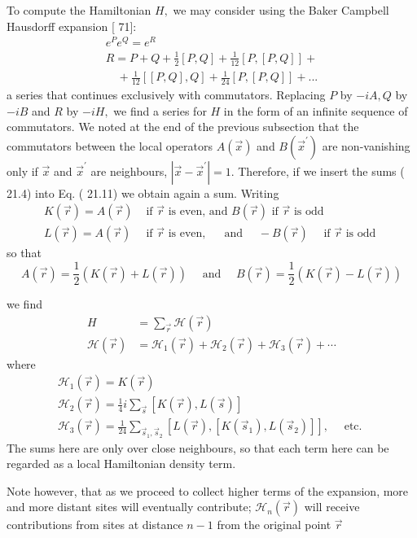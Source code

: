 \documentclass[main.tex]{subfiles}
\begin{document}
To compute the Hamiltonian $H,$ we may consider using the Baker Campbell Hausdorff expansion [ 71]:
$$
\begin{array}{l}
{e^{P} e^{Q}=e^{R}} \\
R = P+Q+\frac{1}{2}[P,Q] + \frac{1}{12}\left[P, [P,Q]\right]+\\
{\quad+\frac{1}{12}[[P, Q], Q]+\frac{1}{24}[P,[P, Q]]} +...
\end{array}
$$
a series that continues exclusively with commutators. Replacing $P$ by $-i A, Q$ by
$-i B$ and $R$ by $-i H,$ we find a series for $H$ in the form of an infinite sequence of commutators. We noted at the end of the previous subsection that the commutators between the local operators $A(\vec{x})$ and $B\left(\vec{x}^{\prime}\right)$ are non-vanishing only if $\vec{x}$ and $\vec{x}^{\prime}$ are neighbours, $\left|\vec{x}-\vec{x}^{\prime}\right|=1 .$ Therefore, if we insert the sums ( 21.4) into Eq. ( 21.11) we obtain again a sum. Writing
$$
\begin{aligned}
K(\vec{r})=A(\vec{r}) & \text { if } \vec{r} \text { is even, and } B(\vec{r}) \text { if } \vec{r} \text { is odd } \\
L(\vec{r})=A(\vec{r}) & \text { if } \vec{r} \text { is even, } \quad \text { and } \quad-B(\vec{r}) \quad \text { if } \vec{r} \text { is odd }
\end{aligned}
$$
so that
$$
A(\vec{r})=\frac{1}{2}(K(\vec{r})+L(\vec{r})) \quad \text { and } \quad B(\vec{r})=\frac{1}{2}(K(\vec{r})-L(\vec{r}))
$$

we find
$$
\begin{aligned}
H &=\sum_{\vec{r}} \mathcal{H}(\vec{r}) \\
\mathcal{H}(\vec{r}) &=\mathcal{H}_{1}(\vec{r})+\mathcal{H}_{2}(\vec{r})+\mathcal{H}_{3}(\vec{r})+\cdots
\end{aligned}
$$
where
$$
\begin{array}{l}
{\mathcal{H}_{1}(\vec{r})=K(\vec{r})} \\
{\mathcal{H}_{2}(\vec{r})=\frac{1}{4} i \sum_{\vec{s}}[K(\vec{r}), L(\vec{s})]} \\
{\mathcal{H}_{3}(\vec{r})=\frac{1}{24} \sum_{\vec{s}_{1}, \vec{s}_{2}}\left[L(\vec{r}),\left[K\left(\vec{s}_{1}\right), L\left(\vec{s}_{2}\right)\right]\right], \quad \text { etc. }}
\end{array}
$$
The sums here are only over close neighbours, so that each term here can be regarded as a local Hamiltonian density term.

Note however, that as we proceed to collect higher terms of the expansion, more and more distant sites will eventually contribute; $\mathcal{H}_{n}(\vec{r})$ will receive contributions from sites at distance $n-1$ from the original point $\vec{r}$
\end{document}
